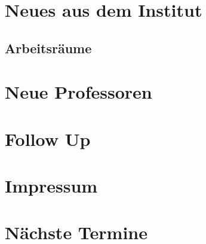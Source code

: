 \documentclass{fsinewsletter}
\begin{document}
\section{Neues aus dem Institut}
\subsection{Arbeitsräume}

\vfill
\newpage
\section{Neue Professoren}

\vfill
\newpage


\section{Follow Up}


\vfill
\newpage
\section{Impressum}


%
\vfill
\newpage
\section{Nächste Termine}

\end{document}
